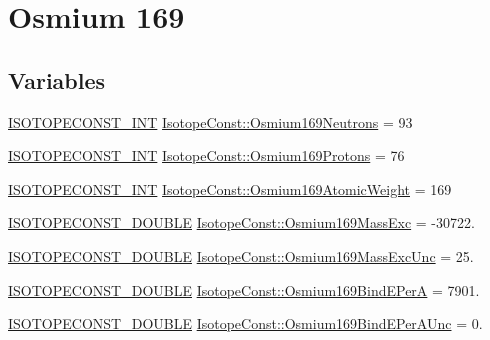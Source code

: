 \hypertarget{group___isotope_const-_osmium-_os169}{}\section{Osmium 169}
\label{group___isotope_const-_osmium-_os169}
\subsection*{Variables}
\begin{DoxyCompactItemize}
\item 
\mbox{\hyperlink{group___isotope_const-_macros_ga5f18360b3e99483a35c32d789e62621c}{I\+S\+O\+T\+O\+P\+E\+C\+O\+N\+S\+T\+\_\+\+I\+NT}} \mbox{\hyperlink{group___isotope_const-_osmium-_os169_ga74404ffda2f9b6e671c1de2a3523dba6}{Isotope\+Const\+::\+Osmium169\+Neutrons}} = 93
\item 
\mbox{\hyperlink{group___isotope_const-_macros_ga5f18360b3e99483a35c32d789e62621c}{I\+S\+O\+T\+O\+P\+E\+C\+O\+N\+S\+T\+\_\+\+I\+NT}} \mbox{\hyperlink{group___isotope_const-_osmium-_os169_gaa4c6cfd2ff74c08dedc6c8a52b1e3b2a}{Isotope\+Const\+::\+Osmium169\+Protons}} = 76
\item 
\mbox{\hyperlink{group___isotope_const-_macros_ga5f18360b3e99483a35c32d789e62621c}{I\+S\+O\+T\+O\+P\+E\+C\+O\+N\+S\+T\+\_\+\+I\+NT}} \mbox{\hyperlink{group___isotope_const-_osmium-_os169_ga347aca4e9617e515df6161b1ef1059a5}{Isotope\+Const\+::\+Osmium169\+Atomic\+Weight}} = 169
\item 
\mbox{\hyperlink{group___isotope_const-_macros_ga8f45a7272ce02c0b4c65c44636ed719a}{I\+S\+O\+T\+O\+P\+E\+C\+O\+N\+S\+T\+\_\+\+D\+O\+U\+B\+LE}} \mbox{\hyperlink{group___isotope_const-_osmium-_os169_ga9d50fd1e23a7a64d4edb28cac2713039}{Isotope\+Const\+::\+Osmium169\+Mass\+Exc}} = -\/30722.
\item 
\mbox{\hyperlink{group___isotope_const-_macros_ga8f45a7272ce02c0b4c65c44636ed719a}{I\+S\+O\+T\+O\+P\+E\+C\+O\+N\+S\+T\+\_\+\+D\+O\+U\+B\+LE}} \mbox{\hyperlink{group___isotope_const-_osmium-_os169_gaf8edbdc60c5a9ef414ee6ee3bf5f3404}{Isotope\+Const\+::\+Osmium169\+Mass\+Exc\+Unc}} = 25.
\item 
\mbox{\hyperlink{group___isotope_const-_macros_ga8f45a7272ce02c0b4c65c44636ed719a}{I\+S\+O\+T\+O\+P\+E\+C\+O\+N\+S\+T\+\_\+\+D\+O\+U\+B\+LE}} \mbox{\hyperlink{group___isotope_const-_osmium-_os169_ga7337573357aa7e5fd6779c4d7c647de2}{Isotope\+Const\+::\+Osmium169\+Bind\+E\+PerA}} = 7901.
\item 
\mbox{\hyperlink{group___isotope_const-_macros_ga8f45a7272ce02c0b4c65c44636ed719a}{I\+S\+O\+T\+O\+P\+E\+C\+O\+N\+S\+T\+\_\+\+D\+O\+U\+B\+LE}} \mbox{\hyperlink{group___isotope_const-_osmium-_os169_ga4353ceff746d75d538bd757e32fdf127}{Isotope\+Const\+::\+Osmium169\+Bind\+E\+Per\+A\+Unc}} = 0.

\end{DoxyCompactItemize}
